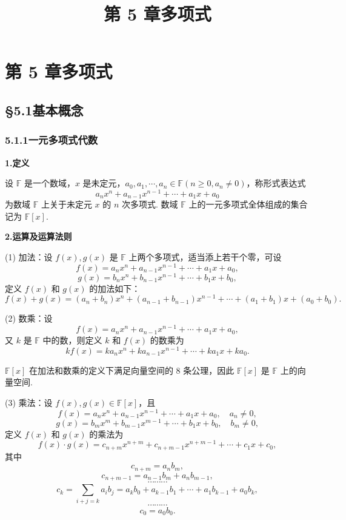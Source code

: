 \documentclass[UTF8,12pt,a4paper,fontset=fandol]{ctexart}
\title{第 5 章\quad 多项式}
\author{}
\date{}
\begin{document}
\maketitle

\section*{第 5 章\quad 多项式}

\subsection*{§5.1\quad 基本概念}

\subsubsection*{5.1.1\quad 一元多项式代数}

\noindent\textbf{1.\quad 定义}

设 $\mathbb{F}$ 是一个数域，$x$ 是未定元，$a_0,a_1,\cdots,a_n\in\mathbb{F}(n\ge 0,a_n\ne0)$，称形式表达式
\[
a_nx^n+a_{n-1}x^{n-1}+\cdots+a_1x+a_0
\]
为数域 $\mathbb{F}$ 上关于未定元 $x$ 的 $n$ 次多项式. 数域 $\mathbb{F}$ 上的一元多项式全体组成的集合记为 $\mathbb{F}[x]$.

\noindent\textbf{2.\quad 运算及运算法则}

(1) 加法：设 $f(x),g(x)$ 是 $\mathbb{F}$ 上两个多项式，适当添上若干个零，可设
\[
f(x)=a_nx^n+a_{n-1}x^{n-1}+\cdots+a_1x+a_0,
\]
\[
g(x)=b_nx^n+b_{n-1}x^{n-1}+\cdots+b_1x+b_0,
\]
定义 $f(x)$ 和 $g(x)$ 的加法如下：
\[
f(x)+g(x)=(a_n+b_n)x^n+(a_{n-1}+b_{n-1})x^{n-1}
+\cdots+(a_1+b_1)x+(a_0+b_0).
\]

(2) 数乘：设
\[
f(x)=a_nx^n+a_{n-1}x^{n-1}+\cdots+a_1x+a_0,
\]
又 $k$ 是 $\mathbb{F}$ 中的数，则定义 $k$ 和 $f(x)$ 的数乘为
\[
kf(x)=ka_nx^n+ka_{n-1}x^{n-1}+\cdots+ka_1x+ka_0.
\]

$\mathbb{F}[x]$ 在加法和数乘的定义下满足向量空间的 8 条公理，因此 $\mathbb{F}[x]$ 是 $\mathbb{F}$ 上的向量空间.

(3) 乘法：设 $f(x),g(x)\in\mathbb{F}[x]$，且
\[
f(x)=a_nx^n+a_{n-1}x^{n-1}+\cdots+a_1x+a_0,\quad a_n\ne0,
\]
\[
g(x)=b_mx^m+b_{m-1}x^{m-1}+\cdots+b_1x+b_0,\quad b_m\ne0,
\]
定义 $f(x)$ 和 $g(x)$ 的乘法为
\[
f(x)\cdot g(x)=c_{n+m}x^{n+m}+c_{n+m-1}x^{n+m-1}+\cdots+c_1x+c_0,
\]
其中
\[
c_{n+m}=a_nb_m,
\]
\[
c_{n+m-1}=a_{n-1}b_m+a_nb_{m-1},
\]
\[
\cdots\cdots\cdots
\]
\[
c_k=\sum_{i+j=k}a_ib_j=a_kb_0+a_{k-1}b_1+\cdots+a_1b_{k-1}+a_0b_k,
\]
\[
\cdots\cdots\cdots
\]
\[
c_0=a_0b_0.
\]
\end{document}
